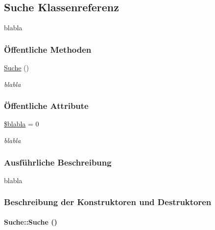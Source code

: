 \hypertarget{classSuche}{
\subsection{Suche Klassenreferenz}
\label{classSuche}
}
blabla  


\subsubsection*{\"{O}ffentliche Methoden}
\begin{CompactItemize}
\item 
\hyperlink{classSuche_e863aff1c9abcb0308d5d3fdcdebb968}{Suche} ()
\begin{CompactList}\small\item\em blabla \item\end{CompactList}\end{CompactItemize}
\subsubsection*{\"{O}ffentliche Attribute}
\begin{CompactItemize}
\item 
\hyperlink{classSuche_4c132138ff7a8f08e3b9fddb540254bb}{\$blabla} = 0
\begin{CompactList}\small\item\em blabla \item\end{CompactList}\end{CompactItemize}


\subsubsection{Ausf\"{u}hrliche Beschreibung}
blabla 



\subsubsection{Beschreibung der Konstruktoren und Destruktoren}
\hypertarget{classSuche_e863aff1c9abcb0308d5d3fdcdebb968}{
\paragraph[Suche]{\setlength{\rightskip}{0pt plus 5cm}Suche::Suche ()}\hfill}
\label{classSuche_e863aff1c9abcb0308d5d3fdcdebb968}


